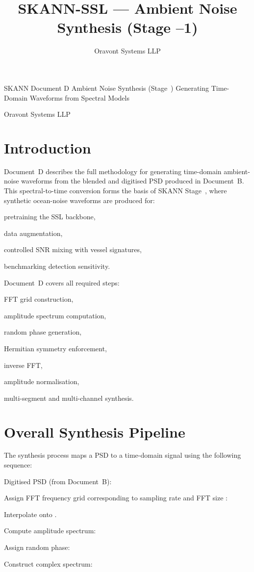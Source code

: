 \documentclass[12pt]{article}
\begin{document}
\title{SKANN-SSL --- Ambient Noise Synthesis (Stage --1)}
\author{Oravont Systems LLP}
\date{}
\maketitle

SKANN Document D
Ambient Noise Synthesis (Stage )
Generating Time-Domain Waveforms from Spectral Models

Oravont Systems LLP

\section*{Introduction}
Document D describes the full methodology for generating time-domain ambient-noise waveforms  from the blended and digitised PSD  produced in Document B. This spectral-to-time conversion forms the basis of SKANN Stage , where synthetic ocean-noise waveforms are produced for:

pretraining the SSL backbone,

data augmentation,

controlled SNR mixing with vessel signatures,

benchmarking detection sensitivity.

Document D covers all required steps:

FFT grid construction,

amplitude spectrum computation,

random phase generation,

Hermitian symmetry enforcement,

inverse FFT,

amplitude normalisation,

multi-segment and multi-channel synthesis.

\section*{Overall Synthesis Pipeline}
The synthesis process maps a PSD to a time-domain signal using the following sequence:

Digitised PSD (from Document B):


Assign FFT frequency grid corresponding to sampling rate  and FFT size :


Interpolate  onto .

Compute amplitude spectrum:


Assign random phase:


Construct complex spectrum:
\end{document}
